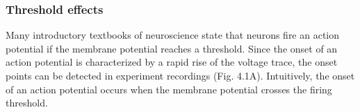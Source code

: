 



\subsubsection{Threshold effects}
Many introductory textbooks of neuroscience state that neurons fire an action potential if the membrane potential reaches a threshold. Since the onset of an action potential is characterized by a rapid rise of the voltage trace, the onset points can be detected in experiment recordings (Fig. 4.1A). Intuitively, the onset of an action potential occurs when the membrane potential crosses the firing threshold.

